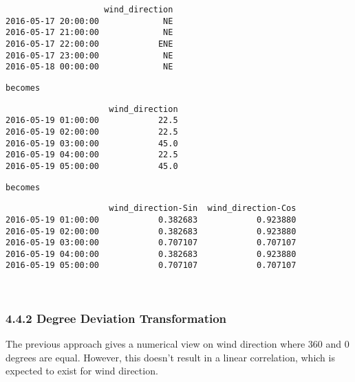 \documentclass[11pt]{article}
\begin{document}
    
    \begin{verbatim}
                    wind_direction
2016-05-17 20:00:00             NE
2016-05-17 21:00:00             NE
2016-05-17 22:00:00            ENE
2016-05-17 23:00:00             NE
2016-05-18 00:00:00             NE
    \end{verbatim}

    
    \begin{Verbatim}[commandchars=\\\{\}]
becomes

    \end{Verbatim}

    
    \begin{verbatim}
                     wind_direction
2016-05-19 01:00:00            22.5
2016-05-19 02:00:00            22.5
2016-05-19 03:00:00            45.0
2016-05-19 04:00:00            22.5
2016-05-19 05:00:00            45.0
    \end{verbatim}

    
    \begin{Verbatim}[commandchars=\\\{\}]
becomes

    \end{Verbatim}

    
    \begin{verbatim}
                     wind_direction-Sin  wind_direction-Cos
2016-05-19 01:00:00            0.382683            0.923880
2016-05-19 02:00:00            0.382683            0.923880
2016-05-19 03:00:00            0.707107            0.707107
2016-05-19 04:00:00            0.382683            0.923880
2016-05-19 05:00:00            0.707107            0.707107
    \end{verbatim}

    
    \begin{center}
    \end{center}
    { \hspace*{\fill} \\}
    
    \subsubsection{4.4.2 Degree Deviation
Transformation}\label{degree-deviation-transformation}

The previous approach gives a numerical view on wind direction where 360
and 0 degrees are equal. However, this doesn't result in a linear
correlation, which is expected to exist for wind direction.
\end{document}
